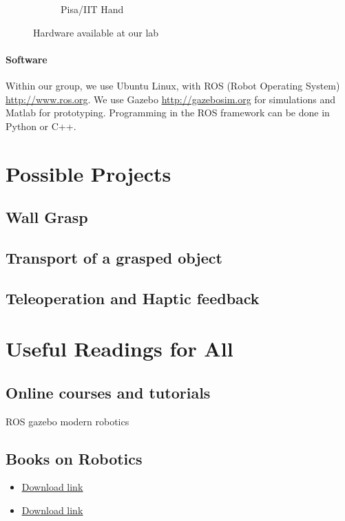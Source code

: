 \documentclass[]{article}
\begin{document}
\begin{figure}[hb!]
\begin{subfigure}[b]{0.22\columnwidth}
		\caption{\footnotesize Pisa/IIT Hand}
		\label{fig:soft_hand}
	\end{subfigure}
	\caption{Hardware available at our lab\vspace*{-10pt}}
\end{figure}

\paragraph{Software} Within our group, we use Ubuntu Linux, with ROS (Robot Operating System)\\ \url{http://www.ros.org}. We use Gazebo \url{http://gazebosim.org} for simulations and Matlab for prototyping. Programming in the ROS framework can be done in Python or C++.


\pagebreak
\section{Possible Projects}
\subsection{Wall Grasp}

\pagebreak
\subsection{Transport of a grasped object}



\pagebreak
\subsection{Teleoperation and Haptic feedback}


\pagebreak
\section{Useful Readings for All}
\subsection{Online courses and tutorials}

ROS
gazebo
modern robotics

\subsection{Books on Robotics}
\begin{itemize}
	\item {} \href{http://b-ok.xyz/book/2802899/0c19ca}{\underline{Download link}}
	
	
		\item {} \href{	http://www.researchgate.net/profile/Mohamed_Mourad_Lafifi/post/How_to_avoid_singular_configurations/attachment/59d6361b79197b807799389a/AS%3A386996594855942%401469278586939/download/Spong+-+Robot+modeling+and+Control.pdf}{\underline{Download link}}
	
	
	
	
	

	
\end{itemize}
\end{document}
